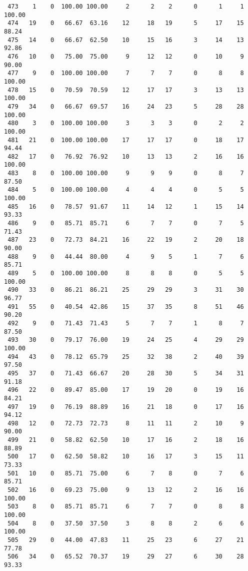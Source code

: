 \begin{verbatim}
 473    1    0  100.00 100.00     2      2    2      0      1     1   100.00
 474   19    0   66.67  63.16    12     18   19      5     17    15    88.24
 475   14    0   66.67  62.50    10     15   16      3     14    13    92.86
 476   10    0   75.00  75.00     9     12   12      0     10     9    90.00
 477    9    0  100.00 100.00     7      7    7      0      8     8   100.00
 478   15    0   70.59  70.59    12     17   17      3     13    13   100.00
 479   34    0   66.67  69.57    16     24   23      5     28    28   100.00
 480    3    0  100.00 100.00     3      3    3      0      2     2   100.00
 481   21    0  100.00 100.00    17     17   17      0     18    17    94.44
 482   17    0   76.92  76.92    10     13   13      2     16    16   100.00
 483    8    0  100.00 100.00     9      9    9      0      8     7    87.50
 484    5    0  100.00 100.00     4      4    4      0      5     5   100.00
 485   16    0   78.57  91.67    11     14   12      1     15    14    93.33
 486    9    0   85.71  85.71     6      7    7      0      7     5    71.43
 487   23    0   72.73  84.21    16     22   19      2     20    18    90.00
 488    9    0   44.44  80.00     4      9    5      1      7     6    85.71
 489    5    0  100.00 100.00     8      8    8      0      5     5   100.00
 490   33    0   86.21  86.21    25     29   29      3     31    30    96.77
 491   55    0   40.54  42.86    15     37   35      8     51    46    90.20
 492    9    0   71.43  71.43     5      7    7      1      8     7    87.50
 493   30    0   79.17  76.00    19     24   25      4     29    29   100.00
 494   43    0   78.12  65.79    25     32   38      2     40    39    97.50
 495   37    0   71.43  66.67    20     28   30      5     34    31    91.18
 496   22    0   89.47  85.00    17     19   20      0     19    16    84.21
 497   19    0   76.19  88.89    16     21   18      0     17    16    94.12
 498   12    0   72.73  72.73     8     11   11      2     10     9    90.00
 499   21    0   58.82  62.50    10     17   16      2     18    16    88.89
 500   17    0   62.50  58.82    10     16   17      3     15    11    73.33
 501   10    0   85.71  75.00     6      7    8      0      7     6    85.71
 502   16    0   69.23  75.00     9     13   12      2     16    16   100.00
 503    8    0   85.71  85.71     6      7    7      0      8     8   100.00
 504    8    0   37.50  37.50     3      8    8      2      6     6   100.00
 505   29    0   44.00  47.83    11     25   23      6     27    21    77.78
 506   34    0   65.52  70.37    19     29   27      6     30    28    93.33

\end{verbatim}
